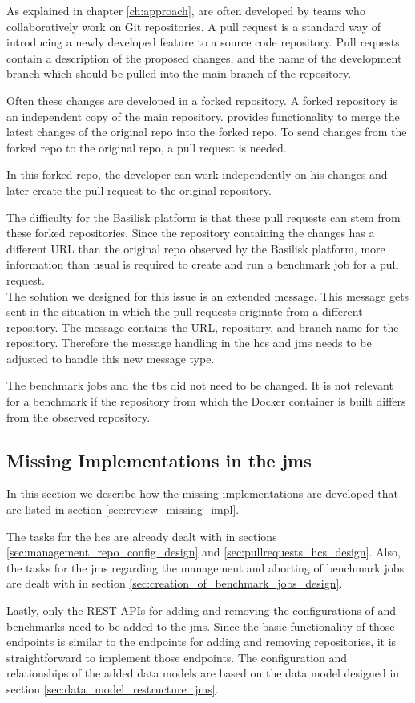 As explained in chapter \ref{ch:approach}, \tsp{} are often developed by teams who collaboratively work on Git repositories.
A pull request is a standard way of introducing a newly developed feature to a source code repository.
Pull requests contain a description of the proposed changes, and the name of the development branch which should be pulled into the main branch of the repository.

Often these changes are developed in a forked repository.
A forked repository is an independent copy of the main repository.
\gh{} provides functionality to merge the latest changes of the original repo into the forked repo.
To send changes from the forked repo to the original repo, a pull request is needed.

In this forked repo, the developer can work independently on his changes and later create the pull request to the original repository.

The difficulty for the Basilisk platform is that these pull requests can stem from these forked repositories.
Since the repository containing the changes has a different URL than the original repo observed by the Basilisk platform, more information than usual is required to create and run a benchmark job for a pull request.
\\

The solution we designed for this issue is an extended message.
This message gets sent in the situation in which the pull requests originate from a different repository.
The message contains the URL, repository, and branch name for the \gh{} repository.
Therefore the message handling in the \ac{hcs} and \ac{jms} needs to be adjusted to handle this new message type.

The benchmark jobs and the \acl{tbs} did not need to be changed.
It is not relevant for a benchmark if the repository from which the Docker container is built differs from the observed repository.


\subsection{Missing Implementations in the \acl{jms}}
In this section we describe how the missing implementations are developed that are listed in section \ref{sec:review_missing_impl}.

The tasks for the \ac{hcs} are already dealt with in sections \ref{sec:management_repo_config_design} and \ref{sec:pullrequests_hcs_design}.
Also, the tasks for the \ac{jms} regarding the management and aborting of benchmark jobs are dealt with in section \ref{sec:creation_of_benchmark_jobs_design}.

Lastly, only the REST APIs for adding and removing the configurations of \tsp{} and benchmarks need to be added to the \ac{jms}.
Since the basic functionality of those endpoints is similar to the endpoints for adding and removing repositories, it is straightforward to implement those endpoints.
The configuration and relationships of the added data models are based on the data model designed in section \ref{sec:data_model_restructure_jms}.



